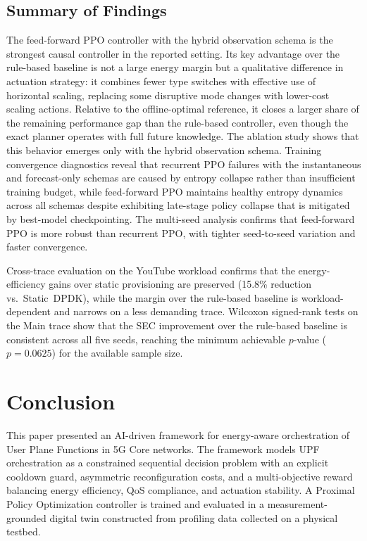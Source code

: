 \documentclass[a4paper,fleqn]{cas-sc}
\begin{document}
\subsection{Summary of Findings}
\label{subsec:results_summary}

The feed-forward PPO controller with the hybrid observation schema is the strongest causal controller in the reported setting. Its key advantage over the rule-based baseline is not a large energy margin but a qualitative difference in actuation strategy: it combines fewer type switches with effective use of horizontal scaling, replacing some disruptive mode changes with lower-cost scaling actions. Relative to the offline-optimal reference, it closes a larger share of the remaining performance gap than the rule-based controller, even though the exact planner operates with full future knowledge. The ablation study shows that this behavior emerges only with the hybrid observation schema. Training convergence diagnostics reveal that recurrent PPO failures with the instantaneous and forecast-only schemas are caused by entropy collapse rather than insufficient training budget, while feed-forward PPO maintains healthy entropy dynamics across all schemas despite exhibiting late-stage policy collapse that is mitigated by best-model checkpointing. The multi-seed analysis confirms that feed-forward PPO is more robust than recurrent PPO, with tighter seed-to-seed variation and faster convergence.

Cross-trace evaluation on the YouTube workload confirms that the energy-efficiency gains over static provisioning are preserved (15.8\% reduction vs.\ Static~DPDK), while the margin over the rule-based baseline is workload-dependent and narrows on a less demanding trace. Wilcoxon signed-rank tests on the Main trace show that the SEC improvement over the rule-based baseline is consistent across all five seeds, reaching the minimum achievable $p$-value ($p=0.0625$) for the available sample size.


\section{Conclusion}
\label{conclusion}

This paper presented an AI-driven framework for energy-aware orchestration of User Plane Functions in 5G Core networks. The framework models UPF orchestration as a constrained sequential decision problem with an explicit cooldown guard, asymmetric reconfiguration costs, and a multi-objective reward balancing energy efficiency, QoS compliance, and actuation stability. A Proximal Policy Optimization controller is trained and evaluated in a measurement-grounded digital twin constructed from profiling data collected on a physical testbed.
\end{document}
